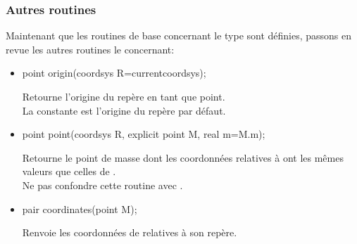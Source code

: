 \documentclass[pdftex]{article}
\begin{document}
\subsubsection{Autres routines}
Maintenant que les routines de base concernant le type  sont
définies, passons en revue les autres routines le concernant:
\begin{itemize}
\item {}
  \begin{Vcolor}
    point origin(coordsys R=currentcoordsys);
  \end{Vcolor}
  Retourne l'origine du repère  en tant que point.\\
  La constante  est l'origine du
  repère par défaut.
\item {}
  \begin{Vcolor}
    point point(coordsys R, explicit point M, real m=M.m);
  \end{Vcolor}
  Retourne le point de masse  dont les coordonnées relatives à  ont les mêmes
  valeurs que celles de .\\Ne pas confondre cette routine avec
  .

\item {}
  \begin{Vcolor}
    pair coordinates(point M);
  \end{Vcolor}
  Renvoie les coordonnées de  relatives à son repère.


\end{itemize}
\end{document}
